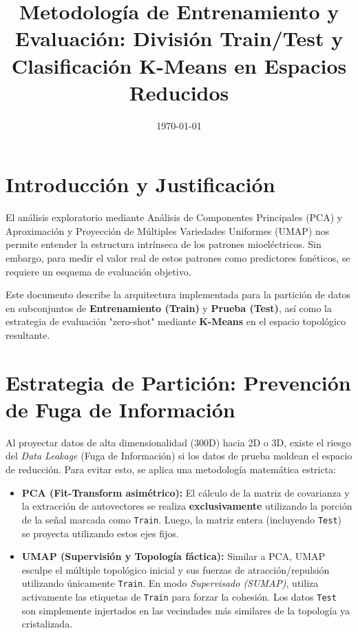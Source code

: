 \documentclass[12pt, a4paper]{article}
\begin{document}
\title{Metodología de Entrenamiento y Evaluación: División Train/Test y Clasificación K-Means en Espacios Reducidos}
\author{}
\date{\today}
\maketitle

\section{Introducción y Justificación}

El análisis exploratorio mediante Análisis de Componentes Principales (PCA) y Aproximación y Proyección de Múltiples Variedades Uniformes (UMAP) nos permite entender la estructura intrínseca de los patrones mioeléctricos. Sin embargo, para medir el valor real de estos patrones como predictores fonéticos, se requiere un esquema de evaluación objetivo. 

Este documento describe la arquitectura implementada para la partición de datos en subconjuntos de \textbf{Entrenamiento (Train)} y \textbf{Prueba (Test)}, así como la estrategia de evaluación "zero-shot" mediante \textbf{K-Means} en el espacio topológico resultante.

\section{Estrategia de Partición: Prevención de Fuga de Información}

Al proyectar datos de alta dimensionalidad (300D) hacia 2D o 3D, existe el riesgo del \textit{Data Leakage} (Fuga de Información) si los datos de prueba moldean el espacio de reducción. Para evitar esto, se aplica una metodología matemática estricta:

\begin{itemize}
    \item \textbf{PCA (Fit-Transform asimétrico):} El cálculo de la matriz de covarianza y la extracción de autovectores se realiza \textbf{exclusivamente} utilizando la porción de la señal marcada como \texttt{Train}. Luego, la matriz entera (incluyendo \texttt{Test}) se proyecta utilizando estos ejes fijos.
    \item \textbf{UMAP (Supervisión y Topología fáctica):} Similar a PCA, UMAP esculpe el múltiple topológico inicial y sus fuerzas de atracción/repulsión utilizando únicamente \texttt{Train}. En modo \textit{Supervisado (SUMAP)}, utiliza activamente las etiquetas de \texttt{Train} para forzar la cohesión. Los datos \texttt{Test} son simplemente injertados en las vecindades más similares de la topología ya cristalizada.
\end{itemize}
\end{document}
